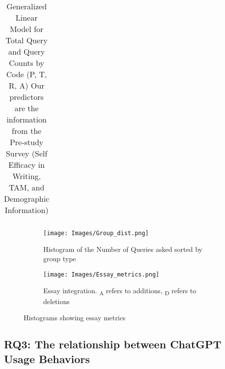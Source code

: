 \documentclass[manuscript,screen,acmsmall]{acmart}
\begin{document}
\begin{table}[t]
{\begin{tabular}{lclcccccc}
\bottomrule
\end{tabular}
}
\caption{Generalized Linear Model for Total Query
and Query Counts by Code (P, T, R, A) 
Our predictors are the information from the Pre-study Survey (Self Efficacy in Writing, TAM, and Demographic Information)}
\label{tab:glm}
\end{table}

\begin{figure}[h]
    \centering
    \begin{subfigure}[b]{0.45\textwidth} 
        \centering
        \texttt{[image: Images/Group\_dist.png]}
        \caption{Histogram of the Number of Queries asked sorted by group type}
        \label{fig:Histogram} 
    \end{subfigure}
    \hfill 
    \begin{subfigure}[b]{0.45\textwidth}
       \centering
       \texttt{[image: Images/Essay\_metrics.png]}
        \caption{Essay integration. \textsubscript{A} refers to additions, \textsubscript{D} refers to deletions}
        \label{fig:EssayMetric}
    \end{subfigure}
    \caption{Histograms showing essay metrics}
    \label{fig:two_figures2} %
\end{figure}


\subsection{RQ3: The relationship between ChatGPT Usage Behaviors}
\end{document}
